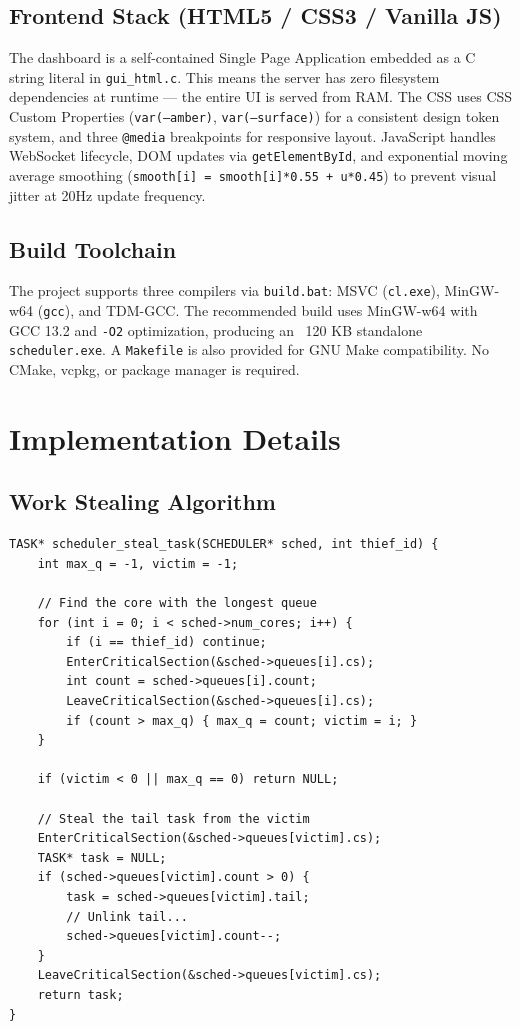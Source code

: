 \documentclass[12pt,a4paper]{article}
\begin{document}
\subsection{Frontend Stack (HTML5 / CSS3 / Vanilla JS)}

The dashboard is a self-contained Single Page Application embedded as a C string literal in \texttt{gui\_html.c}. This means the server has zero filesystem dependencies at runtime — the entire UI is served from RAM. The CSS uses CSS Custom Properties (\texttt{var(--amber)}, \texttt{var(--surface)}) for a consistent design token system, and three \texttt{@media} breakpoints for responsive layout. JavaScript handles WebSocket lifecycle, DOM updates via \texttt{getElementById}, and exponential moving average smoothing (\texttt{smooth[i] = smooth[i]*0.55 + u*0.45}) to prevent visual jitter at 20Hz update frequency.

\subsection{Build Toolchain}

The project supports three compilers via \texttt{build.bat}: MSVC (\texttt{cl.exe}), MinGW-w64 (\texttt{gcc}), and TDM-GCC. The recommended build uses MinGW-w64 with GCC 13.2 and \texttt{-O2} optimization, producing an ~120 KB standalone \texttt{scheduler.exe}. A \texttt{Makefile} is also provided for GNU Make compatibility. No CMake, vcpkg, or package manager is required.

\section{Implementation Details}

\subsection{Work Stealing Algorithm}

\begin{lstlisting}[style=cstyle, caption={Work Stealing Core Logic}]
TASK* scheduler_steal_task(SCHEDULER* sched, int thief_id) {
    int max_q = -1, victim = -1;

    // Find the core with the longest queue
    for (int i = 0; i < sched->num_cores; i++) {
        if (i == thief_id) continue;
        EnterCriticalSection(&sched->queues[i].cs);
        int count = sched->queues[i].count;
        LeaveCriticalSection(&sched->queues[i].cs);
        if (count > max_q) { max_q = count; victim = i; }
    }

    if (victim < 0 || max_q == 0) return NULL;

    // Steal the tail task from the victim
    EnterCriticalSection(&sched->queues[victim].cs);
    TASK* task = NULL;
    if (sched->queues[victim].count > 0) {
        task = sched->queues[victim].tail;
        // Unlink tail...
        sched->queues[victim].count--;
    }
    LeaveCriticalSection(&sched->queues[victim].cs);
    return task;
}
\end{lstlisting}
\end{document}
